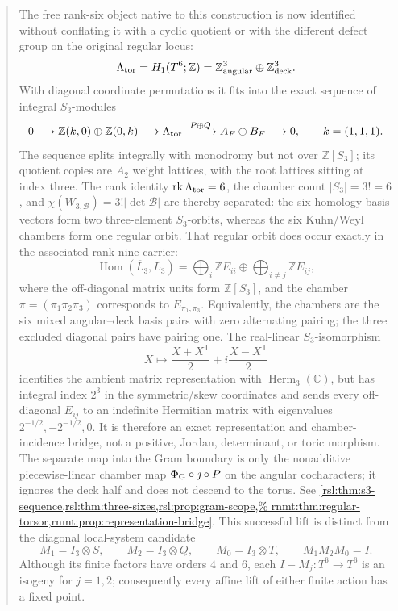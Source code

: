 \documentclass[11pt,letterpaper]{article}
\theoremstyle{definition}
\theoremstyle{remark}
\begin{document}
\begin{abstract}
  The free rank-six object native to this construction is now identified
  without conflating it with a cyclic quotient or with the different defect
  group on the original regular locus:
  \[
   \Lambda_{\rm tor}=H_1(T^6;\mathbb Z)
   =\mathbb Z^3_{\rm angular}\oplus\mathbb Z^3_{\rm deck}.
  \]
  With diagonal coordinate permutations it fits into the exact sequence of
  integral \(S_3\)-modules
  \[
   0\longrightarrow\mathbb Z(k,0)\oplus\mathbb Z(0,k)
   \longrightarrow\Lambda_{\rm tor}
   \xrightarrow{\,P\oplus Q\,}A_F\oplus B_F\longrightarrow0,
   \qquad k=(1,1,1).
  \]
  The sequence splits integrally with monodromy but not over
  \(\mathbb Z[S_3]\); its quotient copies are \(A_2\) weight lattices, with
  the root lattices sitting at index three.  The rank identity
  \(\operatorname{rk}\Lambda_{\rm tor}=6\), the chamber count
  \(|S_3|=3!=6\), and
  \(\chi(W_{3,\mathcal B})=3!|\det\mathcal B|\) are thereby separated: the
  six homology basis vectors form two three-element \(S_3\)-orbits, whereas
  the six Kuhn/Weyl chambers form one regular orbit.  That regular orbit does
  occur exactly in the associated rank-nine carrier:
  \[
   \operatorname{Hom}(\overline L_3,L_3)
   =\bigoplus_i\mathbb ZE_{ii}\oplus
    \bigoplus_{i\ne j}\mathbb ZE_{ij},
  \]
  where the off-diagonal matrix units form \(\mathbb Z[S_3]\), and the
  chamber \(\pi=(\pi_1\pi_2\pi_3)\) corresponds to
  \(E_{\pi_1,\pi_3}\).  Equivalently, the chambers are the six mixed
  angular--deck basis pairs with zero alternating pairing; the three
  excluded diagonal pairs have pairing one.  The real-linear
  \(S_3\)-isomorphism
  \[
   X\longmapsto\frac{X+X^{\mathsf T}}2
          +i\frac{X-X^{\mathsf T}}2
  \]
  identifies the ambient matrix representation with
  \(\operatorname{Herm}_3(\mathbb C)\), but has integral index \(2^3\) in
  the symmetric/skew coordinates and sends every off-diagonal \(E_{ij}\) to
  an indefinite Hermitian matrix with eigenvalues
  \(2^{-1/2},-2^{-1/2},0\).  It is therefore an exact representation and
  chamber-incidence bridge, not a positive, Jordan, determinant, or toric
  morphism.  The separate map into the Gram boundary is only the nonadditive
  piecewise-linear chamber map
  \(\Phi_{\rm G}\circ\jmath\circ P\) on the angular cocharacters; it ignores
  the deck half and does not descend to the torus.  See
  \cref{rsl:thm:s3-sequence,rsl:thm:three-sixes,rsl:prop:gram-scope,%
  rnmt:thm:regular-torsor,rnmt:prop:representation-bridge}.
  This successful lift is distinct from the diagonal local-system candidate
 \[
  M_1=I_3\otimes S,\qquad M_2=I_3\otimes Q,\qquad M_0=I_3\otimes T,
  \qquad M_1M_2M_0=I.
 \]
 Although its finite factors have orders \(4\) and \(6\), each
 \(I-M_j:T^6\to T^6\) is an isogeny for \(j=1,2\); consequently every affine
 lift of either finite action has a fixed point.


\end{abstract}
\end{document}
